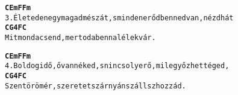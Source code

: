 \cleardoublepage
{}
\kottastart
{}
\kottaend
\begin{minipage}{\textwidth}
\begin{alltt}
\textbf{   C        Em                   F           Fm}
3. Életeden egymagad mész át, s minden erőd benned van, nézd hát
\textbf{    C                     G4         F     C}
   Mit mond a csend, mert odabenn a lélek vár.
\end{alltt}
\vspace{0.0cm}
\versszakspacing
\end{minipage}
\begin{minipage}{\textwidth}
\begin{alltt}
\textbf{    C          Em              F                 Fm}
4. Boldog idő, ő van néked, s nincs oly erő, mi legyőzhet téged,
\textbf{     C              G4                F         C}
   Szent öröm ér, szeretet szárnyán szállsz hozzád.
\end{alltt}
\vspace{0.0cm}
\versszakspacing
\end{minipage}
~\vspace{1.0cm}
\newline
